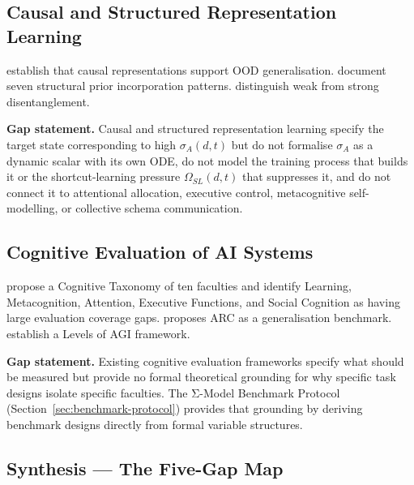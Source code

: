 \documentclass[11pt,a4paper]{article}
\begin{document}
\subsection{Causal and Structured Representation Learning}\label{sec:causal-repr}

\cite{scholkopf2021towardcausalrepresentationlearning} establish that
causal representations support OOD generalisation.
\cite{mohan2024structureindrlsurveyopenproblems} document seven structural
prior incorporation patterns. \cite{torresan2024disentangledrepresentationscausalcognition}
distinguish weak from strong disentanglement.

\textbf{Gap statement.} Causal and structured representation learning
specify the target state corresponding to high $\sigma_A(d,t)$ but do
not formalise $\sigma_A$ as a dynamic scalar with its own ODE, do not
model the training process that builds it or the shortcut-learning pressure
$\Omega_{SL}(d,t)$ \citep{geirhos2020shortcutlearning} that suppresses it, and do not connect it to
attentional allocation, executive control, metacognitive self-modelling,
or collective schema communication.

\subsection{Cognitive Evaluation of AI Systems}\label{sec:cognitive-eval}

\cite{burnell2026measuringprogressagi} propose a Cognitive Taxonomy of
ten faculties and identify Learning, Metacognition, Attention, Executive
Functions, and Social Cognition as having large evaluation coverage gaps.
\cite{chollet2019measureintelligence} proposes ARC as a generalisation
benchmark. \cite{morris2023levelsagi} establish a Levels of AGI framework.

\textbf{Gap statement.} Existing cognitive evaluation frameworks specify
what should be measured but provide no formal theoretical grounding for
why specific task designs isolate specific faculties. The Σ-Model Benchmark
Protocol (Section~\ref{sec:benchmark-protocol}) provides that grounding
by deriving benchmark designs directly from formal variable structures.

\subsection{Synthesis --- The Five-Gap Map}\label{sec:five-gap-map}
\end{document}
